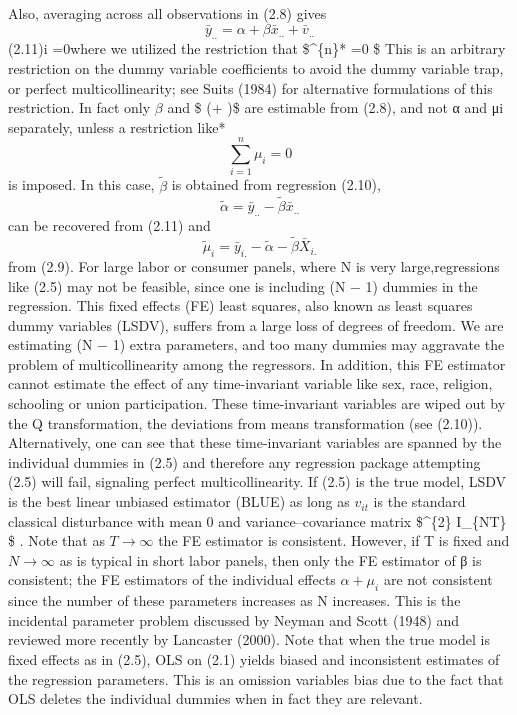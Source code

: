\documentclass[
]{book}
\begin{document}
Also, averaging across all observations in (2.8) gives \[\bar{y}_{..}=\alpha + \beta \bar{x}_{..} + \bar{v}_{..} \] (2.11)i =0where we utilized the restriction that \$\^{}\{n\}* =0 \$ This is an arbitrary restriction on the dummy variable coefficients to avoid the dummy variable trap, or perfect multicollinearity; see Suits (1984) for alternative formulations of this restriction. In fact only \(\beta\) and \$ (\alpha + )\$ are estimable from (2.8), and not α and μi separately, unless a restriction like* \[\sum_{i=1}^{n} \mu_{i}=0 \] is imposed. In this case, \(\widetilde {\beta}\) is obtained from regression (2.10), \[\widetilde {\alpha}= \bar {y}_{..}-\widetilde {\beta} \bar{x}_{..} \] can be recovered from (2.11) and \[\widetilde {\mu}_{i}=\bar{y}_{i.}- \widetilde {\alpha} - \widetilde {\beta} \bar{X}_{i.} \] from (2.9). For large labor or consumer panels, where N is very large,regressions like (2.5) may not be feasible, since one is including (N − 1) dummies in the regression. This fixed effects (FE) least squares, also known as least squares dummy variables (LSDV), suffers from a large loss of degrees of freedom. We are estimating (N − 1) extra parameters, and too many dummies may aggravate the problem of multicollinearity among the regressors. In addition, this FE estimator cannot estimate the effect of any time-invariant variable like sex, race, religion, schooling or union participation. These time-invariant variables are wiped out by the Q transformation, the deviations from means transformation (see (2.10)). Alternatively, one can see that these time-invariant variables are spanned by the individual dummies in (2.5) and therefore any regression package attempting (2.5) will fail, signaling perfect multicollinearity. If (2.5) is the true model, LSDV is the best linear unbiased estimator (BLUE) as long as \(v_{it}\) is the standard classical disturbance with mean 0 and variance--covariance matrix \$\^{}\{2\} I\_\{NT\} \$ . Note that as \(T \rightarrow \infty\) the FE estimator is consistent. However, if T is fixed and \(N \rightarrow \infty\) as is typical in short labor panels, then only the FE estimator of β is consistent; the FE estimators of the individual effects \(\alpha + \mu_{i}\) are not consistent since the number of these parameters increases as N increases. This is the incidental parameter problem discussed by Neyman and Scott (1948) and reviewed more recently by Lancaster (2000). Note that when the true model is fixed effects as in (2.5), OLS on (2.1) yields biased and inconsistent estimates of the regression parameters. This is an omission variables bias due to the fact that OLS deletes the individual dummies when in fact they are relevant.
\end{document}
